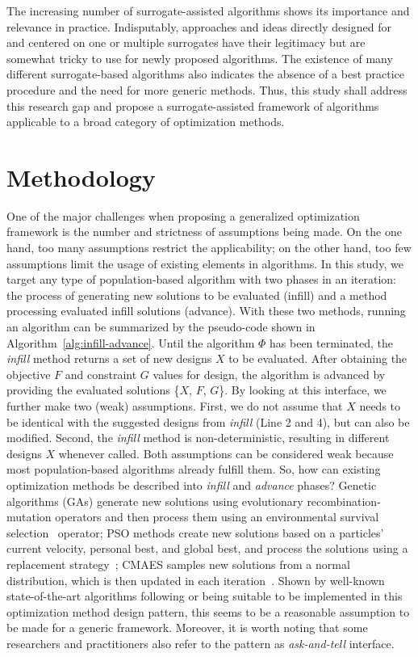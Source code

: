 \documentclass[journal]{IEEEtran}
\begin{document}
The increasing number of surrogate-assisted algorithms shows its importance and relevance in practice. Indisputably, approaches and ideas directly designed for and centered on one or multiple surrogates have their legitimacy but are somewhat tricky to use for newly proposed algorithms.
The existence of many different surrogate-based algorithms also indicates the absence of a best practice procedure and the need for more generic methods. Thus, this study shall address this research gap and propose a surrogate-assisted framework of algorithms applicable to a broad category of optimization methods.


\section{Methodology}
\label{sec:method}

One of the major challenges when proposing a generalized optimization framework is the number and strictness of assumptions being made. 
On the one hand, too many assumptions restrict the applicability; on the other hand, too few assumptions limit the usage of existing elements in algorithms.
In this study, we target any type of population-based algorithm with two phases in an iteration: the process of generating new solutions to be evaluated (infill) and a method processing evaluated infill solutions (advance). 
With these two methods, running an algorithm can be summarized by the pseudo-code shown in Algorithm~\ref{alg:infill-advance}. Until the algorithm $\Phi$ has been terminated, the \emph{infill} method returns a set of new designs $X$ to be evaluated. After obtaining the objective $F$ and constraint $G$ values for design, the algorithm is advanced by providing the evaluated solutions \{$X$, $F$, $G$\}. 
By looking at this interface, we further make two (weak) assumptions. First, we do not assume that $X$ needs to be identical with the suggested designs from \emph{infill} (Line 2 and 4), but can also be modified. Second, the \emph{infill} method is non-deterministic, resulting in different designs $X$ whenever called. Both assumptions can be considered weak because most population-based algorithms already fulfill them.
So, how can existing optimization methods be described into \emph{infill} and \emph{advance} phases?
Genetic algorithms (GAs) generate new solutions using evolutionary recombination-mutation operators and then process them using an environmental survival selection~\cite{1989-goldberg-ga} operator; PSO methods create new solutions based on a particles' current velocity, personal best, and global best, and process the solutions using a replacement strategy~\cite{1995-kennedy-pso}; CMAES samples new solutions from a normal distribution, which is then updated in each iteration~\cite{2001-hansen-cmaes}. Shown by well-known state-of-the-art algorithms following or being suitable to be implemented in this optimization method design pattern, this seems to be a reasonable assumption to be made for a generic framework. Moreover, it is worth noting that some researchers and practitioners also refer to the pattern as \emph{ask-and-tell} interface.
\end{document}
